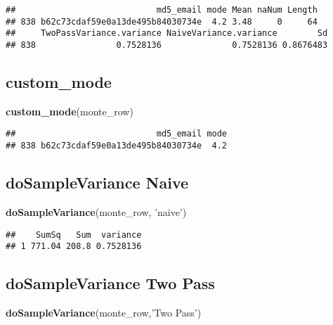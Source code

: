\documentclass[
]{article}
\newenvironment{Shaded}{\begin{snugshade}}{\end{snugshade}}
\newcommand{\KeywordTok}[1]{\textcolor[rgb]{0.13,0.29,0.53}{\textbf{#1}}}
\newcommand{\NormalTok}[1]{#1}
\newcommand{\StringTok}[1]{\textcolor[rgb]{0.31,0.60,0.02}{#1}}
\begin{document}
\begin{Shaded}
\begin{Highlighting}[]
\begin{verbatim}
##                            md5_email mode Mean naNum Length
## 838 b62c73cdaf59e0a13de495b84030734e  4.2 3.48     0     64
##     TwoPassVariance.variance NaiveVariance.variance        Sd
## 838                0.7528136              0.7528136 0.8676483
\end{verbatim}

\hypertarget{custom_mode}{%
\subsection{custom\_mode}\label{custom_mode}}

\begin{Shaded}
\begin{Highlighting}[]
\KeywordTok{custom_mode}\NormalTok{(monte_row)}
\end{Highlighting}
\end{Shaded}

\begin{verbatim}
##                            md5_email mode
## 838 b62c73cdaf59e0a13de495b84030734e  4.2
\end{verbatim}

\hypertarget{dosamplevariance-naive}{%
\subsection{doSampleVariance Naive}\label{dosamplevariance-naive}}

\begin{Shaded}
\begin{Highlighting}[]
\KeywordTok{doSampleVariance}\NormalTok{(monte_row, }\StringTok{'naive'}\NormalTok{)}
\end{Highlighting}
\end{Shaded}

\begin{verbatim}
##    SumSq   Sum  variance
## 1 771.04 208.8 0.7528136
\end{verbatim}

\hypertarget{dosamplevariance-two-pass}{%
\subsection{doSampleVariance Two Pass}\label{dosamplevariance-two-pass}}

\begin{Shaded}
\begin{Highlighting}[]
\KeywordTok{doSampleVariance}\NormalTok{(monte_row,}\StringTok{'Two Pass'}\NormalTok{)}
\end{Highlighting}
\end{Shaded}


\end{Highlighting}
\end{Shaded}
\end{document}
